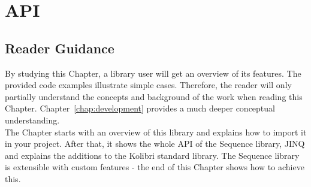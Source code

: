 \chapter{API} %
\label{chap:api}

\section*{Reader Guidance} %
\label{sec:api_reader_guidance}
By studying this Chapter, a library user will get an overview of its features.
The provided code examples illustrate simple cases. Therefore, the reader will
only partially understand the concepts and background of the work when reading
this Chapter. Chapter~\ref{chap:development} provides a much deeper conceptual
understanding. \\ 
The Chapter starts with an overview of this library and explains how to import
it in your project. After that, it shows the whole API of the Sequence library,
JINQ and explains the additions to the Kolibri standard library. The Sequence
library is extensible with custom features - the end of this Chapter shows how
to achieve this.








